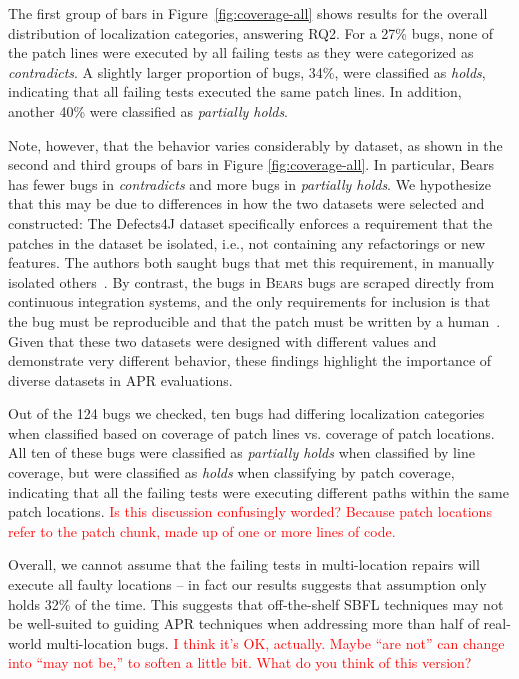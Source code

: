 \documentclass[10pt, conference]{IEEEtran}
\newcommand\todo[1]{\textcolor{red}{#1}}
\newcommand\bears{\textsc{Bears}\xspace}
\begin{document}
The first group of bars in Figure~\ref{fig:coverage-all} shows results for the overall distribution 
of localization categories, 
answering RQ2. 
For a 27\% bugs, none of the patch lines were executed by all failing tests as they were 
categorized as \emph{contradicts}.  A slightly larger proportion of bugs, 34\%, were classified 
as 
\emph{holds}, indicating that all failing tests executed the same patch lines.
In addition, another 40\% were classified as \emph{partially holds}.

Note, however, that the behavior varies considerably by dataset, as shown in the second and 
third groups of bars in Figure \ref{fig:coverage-all}. In particular, Bears has fewer bugs in 
\emph{contradicts} and more bugs in 
\emph{partially holds}.
We hypothesize that this may be due to differences in how the two  
datasets were selected and constructed:
The Defects4J dataset specifically enforces a requirement that the patches in the 
dataset be isolated, i.e., not containing any refactorings or new features.
The authors both saught bugs that met this requirement, in manually isolated others~\cite{defects4j}. By contrast, the 
bugs in 
\bears bugs are scraped directly from continuous integration systems, and the 
only requirements for inclusion is that the bug must be reproducible and that
the patch must be written by a human~\cite{bears}. 
Given that these two datasets were designed with different values and demonstrate very 
different behavior, these findings highlight the importance of diverse datasets
in APR evaluations. 

Out of the 124 bugs we checked, ten bugs had differing localization categories when 
classified based on coverage of patch lines vs. coverage of patch locations. All ten of these 
bugs 
were classified as \emph{partially holds} when classified by line coverage, but were classified as 
\emph{holds} when classifying by patch coverage, indicating that all the failing tests were 
executing different paths within the same patch locations. \todo{Is this discussion confusingly 
worded? Because patch locations refer to the patch chunk, made up of one or more lines of 
code.}

Overall, we cannot assume that the failing tests in multi-location repairs will execute all 
faulty locations -- in fact our results suggests that assumption only holds 32\% of the time. 
This suggests that off-the-shelf SBFL techniques may not be
well-suited to guiding APR techniques when addressing more than half of
real-world multi-location bugs. \todo{I think it's OK, actually.
Maybe ``are not'' can change into ``may not be,'' to soften a little bit. What
do you think of this version?}
\end{document}
